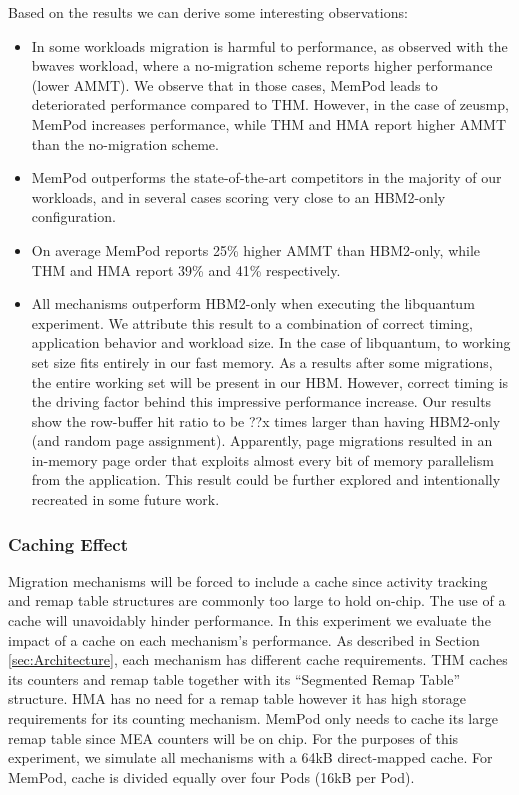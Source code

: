 Based on the results we can derive some interesting observations:
\begin{itemize}
	\item In some workloads migration is harmful to performance, as observed with the bwaves workload, where a no-migration scheme reports higher performance (lower AMMT). We observe that in those cases, MemPod leads to deteriorated performance compared to THM. However, in the case of zeusmp, MemPod increases performance, while THM and HMA report higher AMMT than the no-migration scheme.
	\item MemPod outperforms the state-of-the-art competitors in the majority of our workloads, and in several cases scoring very close to an HBM2-only configuration. 
	\item On average MemPod reports 25\% higher AMMT than HBM2-only, while THM and HMA report 39\% and 41\% respectively.
	\item All mechanisms outperform HBM2-only when executing the libquantum experiment. We attribute this result to a combination of correct timing, application behavior and workload size. In the case of libquantum, to working set size fits entirely in our fast memory. As a results after some migrations, the entire working set will be present in our HBM. However, correct timing is the driving factor behind this impressive performance increase. Our results show the row-buffer hit ratio to be ??x times larger than having HBM2-only (and random page assignment). Apparently, page migrations resulted in an in-memory page order that exploits almost every bit of memory parallelism from the application. This result could be further explored and intentionally recreated in some future work.
\end{itemize}

\subsubsection{Caching Effect}


Migration mechanisms will be forced to include a cache since activity tracking and remap table structures are commonly too large to hold on-chip. The use of a cache will unavoidably hinder performance. In this experiment we evaluate the impact of a cache on each mechanism's performance. As described in Section \ref{sec:Architecture}, each mechanism has different cache requirements. THM caches its counters and remap table together with its ``Segmented Remap Table''  structure. HMA has no need for a remap table however it has high storage requirements for its counting mechanism. MemPod only needs to cache its large remap table since MEA counters will be on chip. For the purposes of this experiment, we simulate all mechanisms with a 64kB direct-mapped cache. For MemPod, cache is divided equally over four Pods (16kB per Pod).

